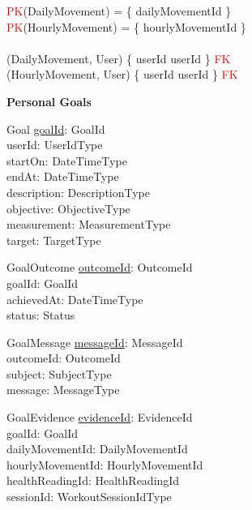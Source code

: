 \documentclass{article}
\begin{document}
\begin{zed}
\textcolor{red}{PK}(DailyMovement) = \{ dailyMovementId \} \\
\textcolor{red}{PK}(HourlyMovement) = \{ hourlyMovementId \} \\
\newline \\ 
(DailyMovement, User) \mapsto \{ userId \mapsto userId \} \in \textcolor{red}{FK} \\
(HourlyMovement, User) \mapsto \{ userId \mapsto userId \} \in \textcolor{red}{FK} \\
\end{zed}
    
\hspace{-0.5cm}\textbf{Personal Goals}

\begin{schema}{Goal}
	\underline{goalId}: GoalId \\
    userId: UserIdType \\
    startOn: DateTimeType \\
    endAt: DateTimeType \\ 
    description: DescriptionType \\
    objective: ObjectiveType \\
    measurement: MeasurementType \\
    target: TargetType \\ 
\end{schema}

\begin{schema}{GoalOutcome}
	\underline{outcomeId}: OutcomeId \\
    goalId: GoalId \\
    achievedAt: DateTimeType \\
    status: Status \\
\end{schema}

\begin{schema}{GoalMessage}
	\underline{messageId}: MessageId \\
    outcomeId: OutcomeId \\
    subject: SubjectType \\
    message: MessageType \\
\end{schema}

\begin{schema}{GoalEvidence}
	\underline{evidenceId}: EvidenceId \\
    goalId: GoalId \\
    dailyMovementId: DailyMovementId \\
    hourlyMovementId: HourlyMovementId \\
    healthReadingId: HealthReadingId \\
    sessionId: WorkoutSessionIdType \\
\end{schema}
\end{document}
